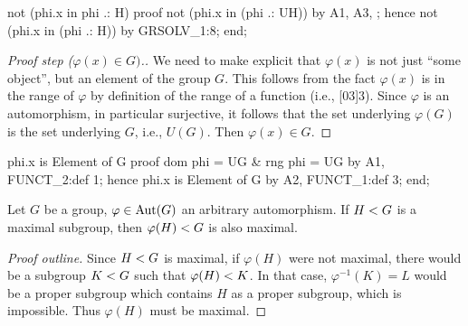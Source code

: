 \nwenddocs{}\endmoddef\nwstartdeflinemarkup{}\nwenddeflinemarkup
not (phi.x in phi .: H)
proof
  not (phi.x in (phi .: UH)) by A1, A3, ;
  hence not (phi.x in (phi .: H)) by GRSOLV_1:8;
end;
\nwendcode{}\nwdocspar

\begin{proof}[Proof step ($\varphi(x)\in G)$.]
We need to make explicit that $\varphi(x)$ is not just ``some object'',
but an element of the group $G$. This follows from the fact $\varphi(x)$
is in the range of $\varphi$ by definition of the range of a function
(i.e., [03]{3}). Since $\varphi$ is
an automorphism, in particular surjective, it follows that the set
underlying $\varphi(G)$ is the set underlying $G$, i.e., $U(G)$.
Then $\varphi(x)\in G$.
\end{proof}

\nwenddocs{}\endmoddef\nwstartdeflinemarkup{}\nwenddeflinemarkup
phi.x is Element of G
proof
  dom phi = UG & rng phi = UG by A1, FUNCT_2:def 1;
  hence phi.x is Element of G by A2, FUNCT_1:def 3;
end;
\nwendcode{}\nwdocspar

\begin{theorem}\label{thm:characteristic:automorphism:image-of-maximal-subgroup-under-automorphism-is-maximal}
  Let $G$ be a group, $\varphi\in\operatorname{Aut}(G)$ an arbitrary automorphism.
  If $H< G$ is a maximal subgroup, then
  $\varphi(H)< G$ is also maximal.
\end{theorem}

\begin{proof}[Proof outline]
  Since $H< G$ is maximal, if $\varphi(H)$ were not
  maximal, there would be a subgroup $K< G$ such that
  $\varphi(H)< K$. In that case, $\varphi^{-1}(K)=L$ would
  be a proper subgroup which contains $H$ as a proper subgroup, which is
  impossible. Thus $\varphi(H)$ must be maximal.
\end{proof}

